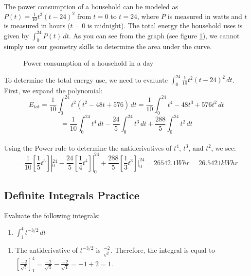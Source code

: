 The power consumption of a household can be modeled as 
$P(t) = \frac{1}{10} t^2 (t - 24)^2$ from $t = 0$ to $t = 24$, where 
$P$ is measured in watts and $t$ is measured in hours ($t = 0$ is 
midnight). The total energy the household uses is given by $\int_{0}^{24} 
P(t)\,dt$. As you can see from the graph (see figure \ref{fig:power}), 
we cannot simply use our geometry skills to determine the area under 
the curve. 

\begin{figure}
	\caption{Power consumption of a household in a day}
	\label{fig:power}
\end{figure}

To determine the total energy use, we need to evaluate $\int_{0}^{24} 
\frac{1}{10}t^2(t-24)^2\,dt$. First, we expand the polynomial:\\
$$E_{tot} = \frac{1}{10} \int_{0}^{24} t^2 (t^2-48t+576)\,dt = 
\frac{1}{10}\int_{0}^{24} t^4 - 48t^3 + 576t^2\,dt$$
$$= \frac{1}{10}\int_{0}^{24} t^4\,dt - \frac{24}{5}\int_{0}^{24} 
t^3\,dt + \frac{288}{5}\int_{0}^{24} t^2\,dt$$\\
Using the Power rule to determine the antiderivatives of $t^4$, $t^3$, 
and $t^2$, we see:\\
$$=\frac{1}{10}[\frac{1}{5}t^5]|_{0}^{24} - \frac{24}{5}
[\frac{1}{4}t^4]|_{0}^{24} + \frac{288}{5}[\frac{1}{3}t^3]|_{0}^{24} 
= 26542.1 Whr = 26.5421 kWhr$$

\subsection{Definite Integrals Practice}
\begin{Exercise}[label=FTC2]
	Evaluate the following integrals:
	\begin{enumerate}
	\item $\int_1^4 t^{-3/2}\,dt$
	\end{enumerate}
\end{Exercise}

\begin{Answer}[ref=FTC2]
	\begin{enumerate}
	\item The antiderivative of $t^{-3/2}$ is $\frac{-2}{\sqrt{t}}$. 
	Therefore, the integral is equal to $[\frac{-2}{\sqrt{t}}]_1^4 = 
	\frac{-2}{\sqrt{4}} - \frac{-2}{\sqrt{1}} = -1 + 2 = 1$. 
	\end{enumerate}
\end{Answer}

